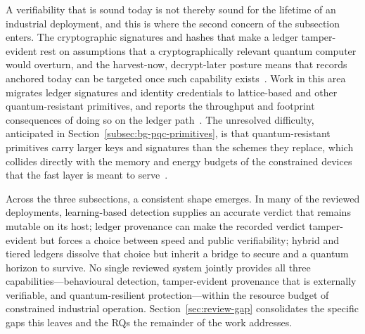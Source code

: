 A verifiability that is sound today is not thereby sound for the lifetime of an
industrial deployment, and this is where the second concern of the subsection
enters. The cryptographic signatures and hashes that make a ledger
tamper-evident rest on assumptions that a cryptographically relevant quantum
computer would overturn, and the harvest-now, decrypt-later posture means that
records anchored today can be targeted once such capability
exists~\cite{reddy2025quantum, revathi2025enhancing}. Work in this area migrates
ledger signatures and identity credentials to lattice-based and other
quantum-resistant primitives, and reports the throughput and footprint
consequences of doing so on the ledger path~\cite{hussain2025quantum,
hao2025efficient}. The unresolved difficulty, anticipated in
Section~\ref{subsec:bg-pqc-primitives}, is that quantum-resistant primitives
carry larger keys and signatures than the schemes they replace, which collides
directly with the memory and energy budgets of the constrained devices that the
fast layer is meant to serve~\cite{hanna2025comprehensive, cruz2025measuring}.

Across the three subsections, a consistent shape emerges. In many of the reviewed
deployments, learning-based detection supplies an accurate verdict that remains
mutable on its host; ledger provenance can make the recorded verdict
tamper-evident but forces a choice between speed and public verifiability; hybrid
and tiered ledgers dissolve that choice but inherit a bridge to secure and a
quantum horizon to survive. No single reviewed system jointly provides all three
capabilities---behavioural detection, tamper-evident provenance that is
externally verifiable, and quantum-resilient protection---within the resource
budget of constrained industrial operation. Section~\ref{sec:review-gap}
consolidates the specific gaps this leaves and the RQs the remainder of the work
addresses.

